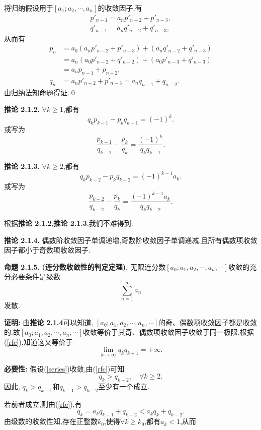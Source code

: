 \par
将归纳假设用于$[a_1;a_2,\cdots,a_n]$的收敛因子,有
\begin{align*}
    p'_{n-1}=a_np'_{n-2}+p'_{n-3}, \\
    q'_{n-1}=a_nq'_{n-2}+q'_{n-3},
\end{align*}
从而有
\begin{align*}
    p_n & =a_0(a_np'_{n-2}+p'_{n-3})+(a_nq'_{n-2}+q'_{n-3}) \\
        & =a_n(a_0p'_{n-2}+q'_{n-2})+(a_0p'_{n-3}+q'_{n-3}) \\
        & =a_np_{n-1}+p_{n-2},                              \\
    q_n & =a_np'_{n-2}+p'_{n-3}=a_nq_{n-1}+q_{n-2}.
\end{align*}
由归纳法知命题得证.\qed
\par
\textbf{推论 2.1.2.  }\textsuperscript{\cite{Khinchin}}
$\forall k\geqslant 1$,都有
$$q_kp_{k-1}-p_kq_{k-1}=(-1)^k.$$
或写为
$$\frac{p_{k-1}}{q_{k-1}}-\frac{p_k}{q_k}=\frac{(-1)^k}{q_kq_{k-1}}.$$
\par
\textbf{推论 2.1.3.  }\textsuperscript{\cite{Khinchin}}
$\forall k\geqslant2$,都有
$$q_kp_{k-2}-p_kq_{k-2}={(-1)}^{k-1}a_k.$$
或写为
$$\frac{p_{k-2}}{q_{k-2}}-\frac{p_k}{q_k}=\frac{(-1)^{k-1}a_k}{q_kq_{k-2}}.$$
\par
根据\textbf{推论  2.1.2},\textbf{推论  2.1.3},我们不难得到:\par
\textbf{推论 2.1.4.  }\textsuperscript{\cite{Khinchin}}
偶数阶收敛因子单调递增,奇数阶收敛因子单调递减,且所有偶数项收敛因子都小于奇数项收敛因子.
\par
\textbf{命题 2.1.5.  }\textsuperscript{\cite{Khinchin}}\textbf{(连分数收敛性的判定定理).  }
无限连分数$[a_0;a_1,a_2,\cdots,a_n,\cdots]$收敛的充分必要条件是级数
\begin{equation}\label{series}
    \sum_{n=1}^{\infty}a_n
\end{equation}
发散.
\par
\textbf{证明:  }
由\textbf{推论 2.1.4}可以知道, $[a_0;a_1,a_2,\cdots,a_n,\cdots]$的奇、偶数项收敛因子都是收敛的.故$[a_0;a_1,a_2,\cdots,a_n,\cdots]$收敛等价于其奇、偶数项收敛因子收敛于同一极限.根据(\ref{rfc}),知道这又等价于
$$\lim_{k\to\infty}{q_kq_{k+1}}=+\infty.$$\par
\textbf{必要性: }假设(\ref{series})收敛,由(\ref{rfc})可知
$$q_k>q_{k-2},\quad \forall k\geqslant 2.$$
因此, $q_k>q_{k-1}$和$q_{k-1}>q_{k-2}$至少有一个成立.\par
若前者成立,则由(\ref{rfc}),有
$$q_k=a_kq_{k-1}+q_{k-2}<a_kq_k+q_{k-2}.$$
由级数的收敛性知,存在正整数$k_0$,使得$\forall k\geqslant k_0$,都有$a_k<1$,从而

